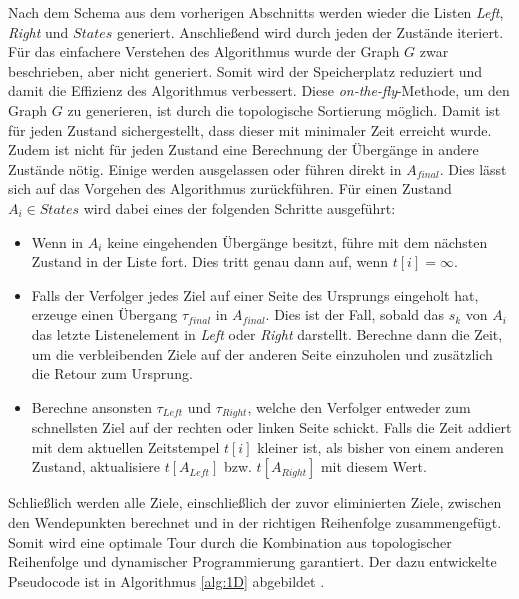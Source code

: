 \documentclass[german,version-2019-11]{uzl-thesis}
\begin{document}
Nach dem Schema aus dem vorherigen Abschnitts werden wieder die Listen \emph{Left}, \emph{Right} und $States$ generiert. Anschließend wird durch jeden der Zustände iteriert. Für das einfachere Verstehen des Algorithmus wurde der Graph $G$ zwar beschrieben, aber nicht generiert. Somit wird der Speicherplatz reduziert und damit die Effizienz des Algorithmus verbessert. Diese \emph{on-the-fly}-Methode, um den Graph $G$ zu generieren, ist durch die topologische Sortierung möglich. Damit ist für jeden Zustand sichergestellt, dass dieser mit minimaler Zeit erreicht wurde. Zudem ist nicht für jeden Zustand eine Berechnung der Übergänge in andere Zustände nötig. Einige werden ausgelassen oder führen direkt in $A_{final}$. Dies lässt sich auf das Vorgehen des Algorithmus zurückführen. Für einen Zustand $A_i\in States$ wird dabei eines der folgenden Schritte ausgeführt:
\begin{itemize}
\item Wenn in $A_i$ keine eingehenden Übergänge besitzt, führe mit dem nächsten Zustand in der Liste fort. Dies tritt genau dann auf, wenn $t[i] = \infty$.
\item Falls der Verfolger jedes Ziel auf einer Seite des Ursprungs eingeholt hat, erzeuge einen Übergang $\tau_{final}$ in $A_{final}$. Dies ist der Fall, sobald das $s_k$ von $A_i$ das letzte Listenelement in \emph{Left} oder \emph{Right} darstellt. Berechne dann die Zeit, um die verbleibenden Ziele auf der anderen Seite einzuholen und zusätzlich die Retour zum Ursprung. 
\item Berechne ansonsten $\tau_{Left}$ und $\tau_{Right}$, welche den Verfolger entweder zum schnellsten Ziel auf der rechten oder linken Seite schickt. Falls die Zeit addiert mit dem aktuellen Zeitstempel $t[i]$ kleiner ist, als bisher von einem anderen Zustand, aktualisiere $t[A_{Left}]$ bzw. $t[A_{Right}]$ mit diesem Wert.
\end{itemize}
Schließlich werden alle Ziele, einschließlich der zuvor eliminierten Ziele, zwischen den Wendepunkten berechnet und in der richtigen Reihenfolge zusammengefügt. Somit wird eine optimale Tour durch die Kombination aus topologischer Reihenfolge und dynamischer Programmierung garantiert. Der dazu entwickelte Pseudocode ist in Algorithmus \ref{alg:1D} abgebildet \cite{helvig}. 
\end{document}
